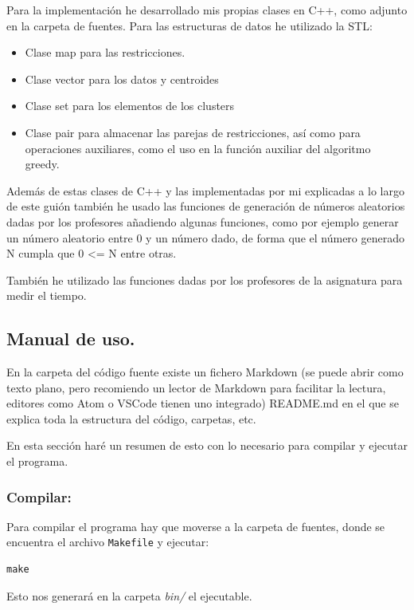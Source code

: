 \documentclass[12pt, spanish]{article}
\begin{document}
Para la implementación he desarrollado mis propias clases en C++, como adjunto en la carpeta de fuentes. Para las estructuras de datos he utilizado la STL:

\begin{itemize}
	\item Clase map para las restricciones.
	\item Clase vector para los datos y centroides
	\item Clase set para los elementos de los clusters
	\item Clase pair para almacenar las parejas de restricciones, así como para operaciones auxiliares, como el uso en la función auxiliar del algoritmo greedy.
\end{itemize}

Además de estas clases de C++ y las implementadas por mi explicadas a lo largo de este guión también he usado las funciones de generación de números aleatorios dadas por los profesores añadiendo algunas funciones, como por ejemplo generar un número aleatorio entre 0 y un número dado, de forma que el número generado N cumpla que 0 <= N entre otras.

También he utilizado las funciones dadas por los profesores de la asignatura para medir el tiempo.


\subsection{Manual de uso.}

En la carpeta del código fuente existe un fichero Markdown (se puede abrir como texto plano, pero recomiendo un lector de Markdown para facilitar la lectura, editores como Atom o VSCode tienen uno integrado) README.md en el que se explica toda la estructura del código, carpetas, etc.

En esta sección haré un resumen de esto con lo necesario para compilar y ejecutar el programa.

\subsubsection{Compilar:}

Para compilar el programa hay que moverse a la carpeta de fuentes, donde se encuentra el archivo \texttt{Makefile} y ejecutar:

\begin{lstlisting}
make
\end{lstlisting}

Esto nos generará en la carpeta \textit{bin/} el ejecutable.
\end{document}
